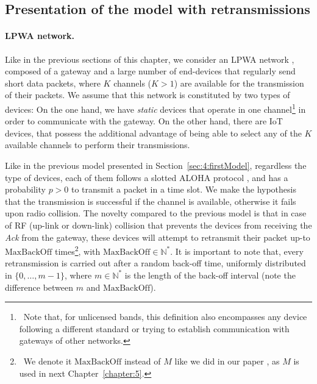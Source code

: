 \subsection{Presentation of the model with retransmissions}
\label{sub:43:model}

\paragraph{LPWA network.}

Like in the previous sections of this chapter, we consider an LPWA network \cite{Raza17}, composed of a gateway and a large number of end-devices that regularly send short data packets, where $K$ channels ($K>1$) are available for the transmission of their packets.
%
We assume that this network is constituted by two types of devices:
On the one hand, we have \emph{static} devices that operate in one channel\footnote{~Note that, for unlicensed bands, this definition also encompasses any device following a different standard or trying to establish communication with gateways of other networks.} in order to communicate with the gateway.
%
On the other hand, there are  IoT devices, that possess the additional advantage of being able to select any of the $K$ available channels to perform their transmissions.

Like in the previous model presented in Section~\ref{sec:4:firstModel},
regardless the type of devices, each of them follows a slotted ALOHA protocol \cite{Roberts75}, and has a probability $p>0$ to transmit a packet in a time slot.
We make the hypothesis that the transmission is successful if the channel is available, otherwise it fails upon radio collision.
The novelty compared to the previous model is that
in case of RF (up-link or down-link) collision that prevents the devices from receiving the \emph{Ack} from the gateway,
these devices will attempt to retransmit their packet up-to $\mathrm{MaxBackOff}$ times\footnote{~We denote it $\mathrm{MaxBackOff}$ instead of $M$ like we did in our paper \cite{Bonnefoi2019WCNC}, as $M$ is used in next Chapter~\ref{chapter:5}.},
with $\mathrm{MaxBackOff} \in\mathbb{N}^*$.
It is important to note that, every retransmission is carried out after a random back-off time, uniformly distributed in $\{0, \dots, m-1\}$, where $m \in\mathbb{N}^*$ is the length of the back-off interval
(note the difference between $m$ and $\mathrm{MaxBackOff}$).


